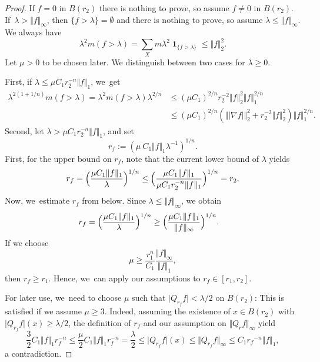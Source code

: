 \documentclass[JEP,XML,SOM,Unicode,published]{cedram}
\theoremstyle{plain}
\theoremstyle{definition}
\DeclareMathOperator{\Eins}{\mathbf{1}}
\begin{document}
\begin{proof}If $f=0$ in $B(r_2)$ there is nothing to prove, so assume $f\neq 0$ in $B(r_2)$. If~$\lambda>\Vert f\Vert_\infty$, then $\{f>\lambda\}=\emptyset$ and there is nothing to prove, so assume $\lambda \leq \Vert f\Vert_\infty$. We always have
\[
\lambda^2 m(f>\lambda)=\sum_X m \lambda^2\Eins_{\{f>\lambda\}}\leq \Vert f\Vert_2^2.
\]
Let $\mu>0$ to be chosen later. We distinguish between two cases for $\lambda\geq 0$.

First, if $\lambda\leq \mu C_1 r_2^{-n}\Vert f\Vert_1$, we~get
\begin{align*}
\lambda^{2(1+1/n)}m(f>\lambda)=\lambda^2m(f>\lambda)\lambda^{2/n}&\leq (\mu C_1)^{2/n} r_2^{-2}\Vert f\Vert_2^2\Vert f\Vert_1^{2/n}
\\
&\leq (\mu C_1)^{2/n}\left( \Vert|\nabla f|\Vert_2^2+r_2^{-2}\Vert f\Vert_2^2\right)\Vert f\Vert_1^{2/n}.
\end{align*}
Second, let $\lambda> \mu C_1 r_2^{-n}\Vert f\Vert_1$, and set
\[
r_f:=(\mu\ C_1\Vert f\Vert_1\lambda^{-1})^{1/n}.
\]
First, for the upper bound on $r_f$, note that the current lower bound of $\lambda$ yields
\[
r_f=
\Bigl(\frac{\mu C_1\Vert f\Vert_1}{\lambda}\Bigr)^{1/n}
\leq
\Bigl(\frac{\mu C_1\Vert f\Vert_1}{\mu C_1 r_2^{-n}\Vert f\Vert_1}\Bigr)^{1/n}=r_2.
\]
Now, we~estimate $r_f$ from below.
Since
$\lambda\leq\Vert f\Vert_\infty$,
we obtain
\begin{align*}
r_f
=
\Bigl(\frac{\mu C_1\Vert f\Vert_1}{\lambda}\Bigr)^{1/n}
&\geq
\Bigl(\frac{\mu C_1\Vert f\Vert_1}{\Vert f\Vert_\infty}\Bigr)^{1/n}.
\end{align*}
If we choose
\[
\mu
\geq \frac{r_1^n}{C_1} \frac{\Vert f\Vert_\infty}{\Vert f\Vert_1},
\]
then
$r_f\geq r_1$.
Hence, we~can apply our assumptions to $r_f\in[ r_1,r_2]$.

For later use, we~need to choose $\mu$ such that $\vert Q_{r_f} f\vert <\lambda/2$ on $B(r_2)$: This is satisfied if we assume $\mu\geq 3$. Indeed, assuming the existence of $x\in B(r_2)$ with $\vert Q_{r_f} f\vert(x) \geq \lambda/2$, the definition of $r_f$ and our assumption on $\Vert Q_{r}f\Vert_\infty$ yield
\[
\frac{3}{2}C_1\Vert f\Vert_1 r_f^{-n}
\leq \frac{\mu}{2}C_1\Vert f\Vert_1 r_f^{-n}=\frac{\lambda}{2}\leq\vert Q_{r_f}f\vert(x)\leq \Vert Q_{r_f}f\Vert_\infty\leq C_1{r_f}^{-n}\Vert f\Vert_1,
\]
a contradiction.


\end{proof}
\end{document}

